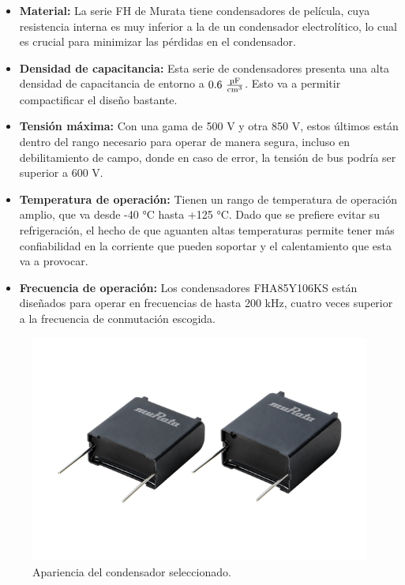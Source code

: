 \begin{itemize}
	\item \textbf{Material:} La serie FH de Murata tiene condensadores de película, cuya resistencia interna es muy inferior a la de un condensador electrolítico, lo cual es crucial para minimizar las pérdidas en el condensador.
	
	\item \textbf{Densidad de capacitancia:} Esta serie de condensadores presenta una alta densidad de capacitancia de entorno a $0.6\text{ }\frac{\text{\unit{\micro\farad}}}{\text{cm}^3}$. Esto va a permitir compactificar el diseño bastante.
	
	\item \textbf{Tensión máxima:} Con una gama de 500 V y otra 850 V, estos últimos están dentro del rango necesario para operar de manera segura, incluso en debilitamiento de campo, donde en caso de error, la tensión de bus podría ser superior a 600 V.
	
	\item \textbf{Temperatura de operación:} Tienen un rango de temperatura de operación amplio, que va desde -40 °C hasta +125 °C. Dado que se prefiere evitar su refrigeración, el hecho de que aguanten altas temperaturas permite tener más confiabilidad en la corriente que pueden soportar y el calentamiento que esta va a provocar.
	
	\item \textbf{Frecuencia de operación:} Los condensadores FHA85Y106KS están diseñados para operar en frecuencias de hasta 200 kHz, cuatro veces superior a la frecuencia de conmutación escogida.
	
	
\end{itemize}

\begin{figure}[H]
	\centering
	\includegraphics[width=0.7\linewidth]{fig/FHA85Y106KS}
	\caption{Apariencia del condensador seleccionado.}
\end{figure}


